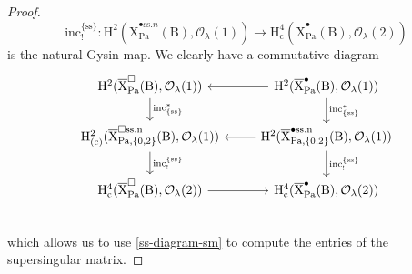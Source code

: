 \documentclass[10pt]{amsart}
\numberwithin{equation}{section}
\theoremstyle{definition}
\def\Pa{\mathrm{Pa}}
\def\calO{\mathcal{O}}
\def\rmc{\mathrm{c}}
\def\rmB{\mathrm{B}}
\def\rmH{\mathrm{H}}
\def\rmX{\mathrm{X}}
\begin{document}
\begin{proof}
\begin{equation*}
\mathrm{inc}^{\{\mathrm{ss}\}}_{!}: \rmH^{2}(\overline{\rmX}^{\bullet\mathrm{ss}.n}_{\Pa}(\rmB), \calO_{\lambda}(1))\rightarrow \rmH^{4}_{\rmc}(\overline{\rmX}^{\bullet}_{\Pa}(\rmB), \calO_{\lambda}(2)) 
\end{equation*}
is the natural Gysin map. We clearly have a commutative diagram
\begin{equation*}
\begin{tikzcd}
 \rmH^{2}(\overline{\rmX}^{\square}_{\Pa}(\rmB), \calO_{\lambda}(1))  \arrow[d, "\mathrm{inc}^{\ast}_{\{\mathrm{ss}\}}"] & \rmH^{2}(\overline{\rmX}^{\bullet}_{\Pa}(\rmB), \calO_{\lambda}(1))  \arrow[d,  "\mathrm{inc}^{\ast}_{\{\mathrm{ss}\}}"]\arrow[l] \\
\rmH^{2}_{(\rmc)}(\overline{\rmX}^{\square\mathrm{ss.n}}_{\Pa, \{0,2\}}(\rmB), \calO_{\lambda}(1)) \arrow[d, "\mathrm{inc}^{\{\mathrm{ss}\}}_{!}"] &  \rmH^{2}(\overline{\rmX}^{\bullet\mathrm{ss.n}}_{\Pa, \{0,2\}}(\rmB), \calO_{\lambda}(1)) \arrow[d, "\mathrm{inc}^{\{\mathrm{ss}\}}_{!}"] \arrow[l]\\
\rmH^{4}_{\rmc}(\overline{\rmX}^{\square}_{\Pa}(\rmB), \calO_{\lambda}(2)) \arrow[r]  &\rmH^{4}_{\rmc}(\overline{\rmX}^{\bullet}_{\Pa}(\rmB), \calO_{\lambda}(2))  \\
\end{tikzcd}
\end{equation*}
which allows us to use \eqref{ss-diagram-sm} to compute the entries of the supersingular matrix.



\end{proof}
\end{document}
